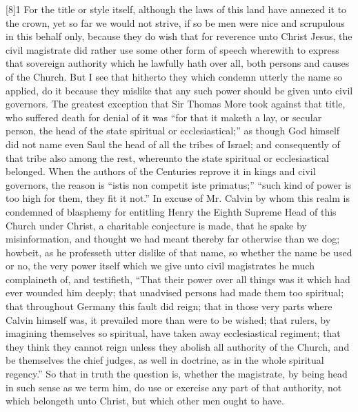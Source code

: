 [8]1 For the title or style itself, although the laws of this land have annexed it to the crown, yet so far we would not strive, if so be men were nice and scrupulous in this behalf only, because they do wish that for reverence unto Christ Jesus, the civil magistrate did rather use some other form of speech wherewith to express that sovereign authority which  he lawfully hath over all, both persons and causes of the Church. But I see that hitherto they which condemn utterly the name so applied, do it because they mislike that any such power should be given unto civil governors. The greatest exception that Sir Thomas More took against that title, who suffered death for denial of it was “for that it maketh a lay, or secular person, the head of the state spiritual or ecclesiastical;” as though God himself did not name even Saul the head of all the tribes of Israel; and consequently of that tribe also among the rest, whereunto the state spiritual or ecclesiastical belonged. When the authors of the Centuries reprove it in kings and civil governors, the reason is “istis non competit iste primatus;” “such kind of power is too high for them, they fit it not.” In excuse of Mr. Calvin by whom this realm is condemned of blasphemy for entitling Henry the Eighth Supreme Head of this Church under Christ, a charitable conjecture is made, that he spake by misinformation, and thought we had meant thereby far otherwise than we dog; howbeit, as he professeth utter dislike of that name, so whether the name be used or no, the very power itself which we give unto civil magistrates he much complaineth of,  and testifieth, “That their power over all things was it which had ever wounded him deeply; that unadvised persons had made them too spiritual; that throughout Germany this fault did reign; that in those very parts where Calvin himself was, it prevailed more than were to be wished; that rulers, by imagining themselves so spiritual, have taken away ecclesiastical regiment; that they think they cannot reign unless they abolish all authority of the Church, and be themselves the chief judges, as well in doctrine, as in the whole spiritual regency.” So that in truth the question is, whether the magistrate, by being head in such sense as we term him, do use or exercise any part of that authority, not which belongeth unto Christ, but which other men ought to have.

